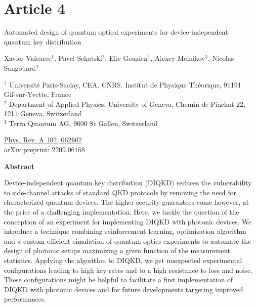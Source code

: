 \chapter*{Article 4}

\begin{center}
\textrm{\LARGE Automated design of quantum optical experiments for device-independent quantum key distribution}

\vspace{2cm}

\normalsize
Xavier Valcarce$^{1}$, Pavel Sekatski$^{2}$, Elie Gouzien$^{1}$, Alexey Melnikov$^{3}$, Nicolas Sangouard$^{1}$
\bigbreak

{\footnotesize
	$^1$ Université Paris-Saclay, CEA, CNRS, Institut de Physique Théorique, 91191 Gif-sur-Yvette, France \\
	$^2$ Department of Applied Physics, University of Geneva, Chemin de Pinchat 22, 1211 Geneva, Switzerland \\
	$^3$ Terra Quantum AG, 9000 St Gallen, Switzerland
}

\raggedright
\bigbreak
\faLink \quad \href{https://journals.aps.org/pra/abstract/10.1103/PhysRevA.107.062607}{Phys. Rev. A 107, 062607} \\
\faLink \quad \href{https://arxiv.org/abs/2209.06468}{arXiv preprint: 2209.06468}
\vspace{1cm}

\centering
\textbf{Abstract}
\bigbreak

Device-independent quantum key distribution (DIQKD) reduces the vulnerability to side-channel attacks of standard QKD protocols by removing the need for characterized quantum devices.
The higher security guarantees come however, at the price of a challenging implementation.
Here, we tackle the question of the conception of an experiment for implementing DIQKD with photonic devices.
We introduce a technique combining reinforcement learning, optimisation algorithm and a custom efficient simulation of quantum optics experiments to automate the design of photonic setups maximizing a given function of the measurement statistics.
Applying the algorithm to DIQKD, we get unexpected experimental configurations leading to high key rates and to a high resistance to loss and noise.
These configurations might be helpful to facilitate a first implementation of DIQKD with photonic devices and for future developments targeting improved performances.

\end{center}
